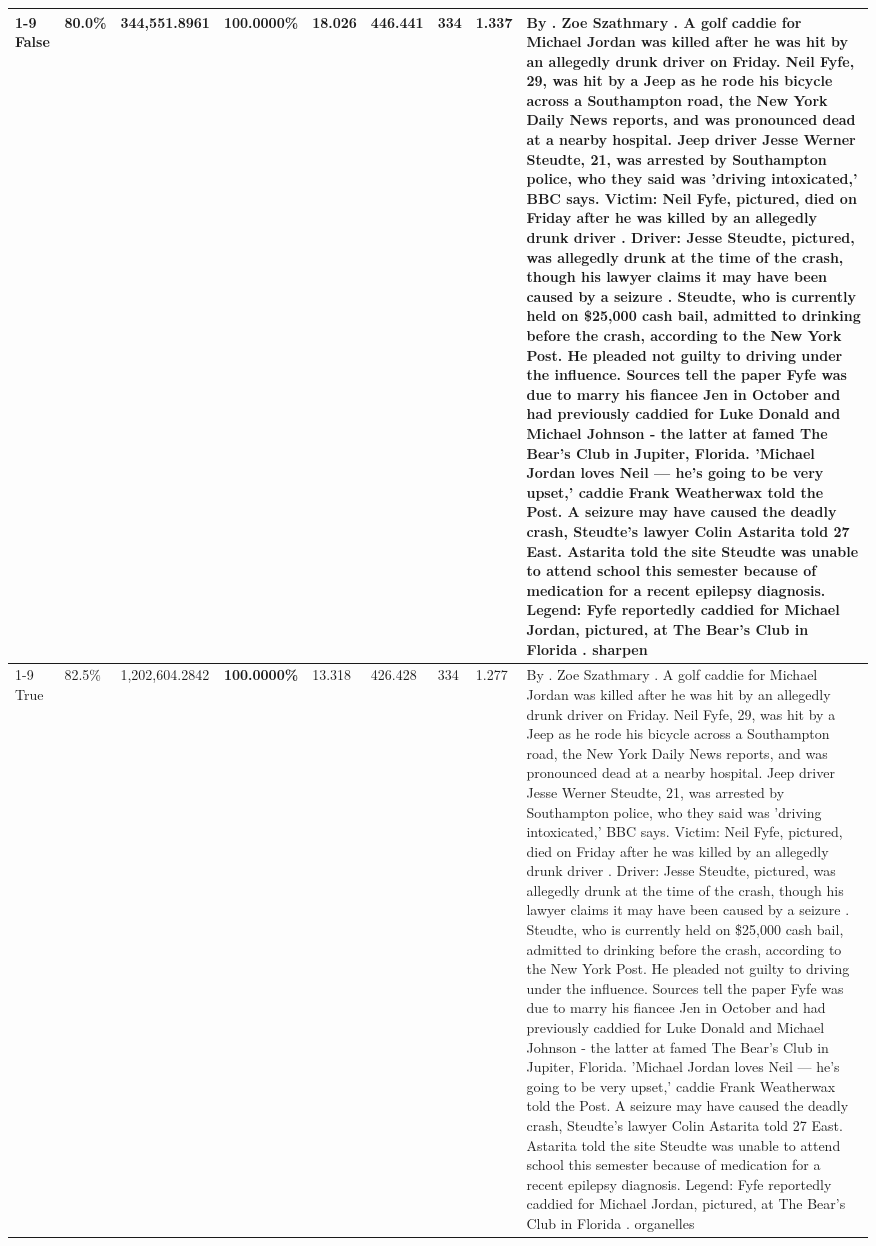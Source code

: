 \begin{table}[H]
\begin{tabular}{lllrlllll}
\cline{1-9}
False & 80.0\% & 344,551.8961 & \bfseries \color{red} 100.0000\% & 18.026 & 446.441 & 334 & 1.337 & By . Zoe Szathmary . A golf caddie for Michael Jordan was killed after he was hit by an allegedly drunk driver on Friday. Neil Fyfe, 29, was hit by a Jeep as he rode his bicycle across a Southampton road, the New York Daily News reports, and was pronounced dead at a nearby hospital. Jeep driver Jesse Werner Steudte, 21, was arrested by Southampton police, who they said was 'driving intoxicated,' BBC says. Victim: Neil Fyfe, pictured, died on Friday after he was killed by an allegedly drunk driver . Driver: Jesse Steudte, pictured, was allegedly drunk at the time of the crash, though his lawyer claims it may have been caused by a seizure . Steudte, who is currently held on \$25,000 cash bail, admitted to drinking before the crash, according to the New York Post. He pleaded not guilty to driving under the influence. Sources tell the paper Fyfe was due to marry his fiancee Jen in October and had previously caddied for Luke Donald and Michael Johnson - the latter at famed The Bear's Club in Jupiter, Florida. 'Michael Jordan loves Neil — he’s going to be very upset,' caddie Frank Weatherwax told the Post. A seizure may have caused the deadly crash, Steudte's lawyer Colin Astarita told 27 East. Astarita told the site Steudte was unable to attend school this semester because of medication for a recent epilepsy diagnosis. Legend: Fyfe reportedly caddied for Michael Jordan, pictured, at The Bear's Club in Florida . sharpen \\
\cline{1-9}
True & 82.5\% & 1,202,604.2842 & \bfseries \color{red} 100.0000\% & 13.318 & 426.428 & 334 & 1.277 & By . Zoe Szathmary . A golf caddie for Michael Jordan was killed after he was hit by an allegedly drunk driver on Friday. Neil Fyfe, 29, was hit by a Jeep as he rode his bicycle across a Southampton road, the New York Daily News reports, and was pronounced dead at a nearby hospital. Jeep driver Jesse Werner Steudte, 21, was arrested by Southampton police, who they said was 'driving intoxicated,' BBC says. Victim: Neil Fyfe, pictured, died on Friday after he was killed by an allegedly drunk driver . Driver: Jesse Steudte, pictured, was allegedly drunk at the time of the crash, though his lawyer claims it may have been caused by a seizure . Steudte, who is currently held on \$25,000 cash bail, admitted to drinking before the crash, according to the New York Post. He pleaded not guilty to driving under the influence. Sources tell the paper Fyfe was due to marry his fiancee Jen in October and had previously caddied for Luke Donald and Michael Johnson - the latter at famed The Bear's Club in Jupiter, Florida. 'Michael Jordan loves Neil — he’s going to be very upset,' caddie Frank Weatherwax told the Post. A seizure may have caused the deadly crash, Steudte's lawyer Colin Astarita told 27 East. Astarita told the site Steudte was unable to attend school this semester because of medication for a recent epilepsy diagnosis. Legend: Fyfe reportedly caddied for Michael Jordan, pictured, at The Bear's Club in Florida . organelles \\

\end{tabular}
\end{table}
